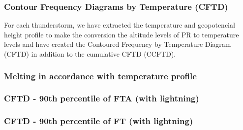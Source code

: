 \documentclass[smaller]{beamer}
\begin{document}



\begin{frame}
\frametitle{Contour Frequency Diagrams by Temperature (CFTD)}
For each thunderstorm, we have extracted the temperature and
geopotencial height profile to make the conversion the altitude levels of PR to temperature levels and have created the Contoured Frequency by Temperature Diagram (CFTD) in addition to the cumulative CFTD (CCFTD).
\end{frame}


\begin{frame}
\frametitle{Melting in accordance with temperature profile}
\end{frame} 







\begin{frame}
\frametitle{CFTD - 90th percentile of FTA (with lightning) }

\end{frame}
\begin{frame}
\frametitle{CFTD - 90th percentile of FT (with lightning) }

\end{frame}
\end{document}
